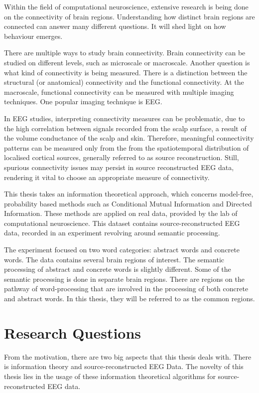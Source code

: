 Within the field of computational neuroscience, extensive research is being done on the connectivity of brain regions. Understanding how distinct brain regions are connected can answer many different questions. It will shed light on how behaviour emerges. 

There are multiple ways to study brain connectivity. Brain connectivity can be studied on different levels, such as microscale or macroscale. Another question is what kind of connectivity is being measured. There is a distinction between the structural (or anatomical) connectivity and the functional connectivity. At the macroscale, functional connectivity can be measured with multiple imaging techniques. One popular imaging technique is EEG.

In EEG studies, interpreting connectivity measures can be problematic, due to the high correlation between signals recorded from the scalp surface, a result of the volume conductance of the scalp and skin. Therefore, meaningful connectivity patterns can be measured only from the from the spatiotemporal distribution of localised cortical sources, generally referred to as source reconstruction. Still, spurious connectivity issues may persist in source reconstructed EEG data, rendering it vital to choose an appropriate measure of connectivity.

This thesis takes an information theoretical approach, which concerns model-free, probability based methods such as Conditional Mutual Information and Directed Information. These methods are applied on real data, provided by the lab of computational neuroscience. This dataset contains source-reconstructed EEG data, recorded in an experiment revolving around semantic processing. 

The experiment focused on two word categories: abstract words and concrete words. The data contains several brain regions of interest. The semantic processing of abstract and concrete words is slightly different. Some of the semantic processing is done in separate brain regions. There are regions on the pathway of word-processing that are involved in the processing of both concrete and abstract words. In this thesis, they will be referred to as the common regions.

\section{Research Questions}

From the motivation, there are two big aspects that this thesis deals with. There is information theory and source-reconstructed EEG Data. The novelty of this thesis lies in the usage of these information theoretical algorithms for source-reconstructed EEG data.

